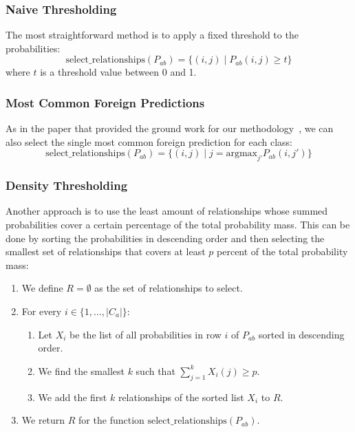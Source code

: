 \subsubsection{Naive Thresholding}

The most straightforward method is to apply a fixed threshold to the probabilities:
\begin{equation*}
      \text{select\_relationships}(P_{ab}) = \{(i, j) \mid P_{ab}(i, j) \geq t\}
\end{equation*}
where $t$ is a threshold value between 0 and 1.

\subsubsection{Most Common Foreign Predictions}

As in the paper that provided the ground work for our methodology~\cite{bevandic_automatic_2022},
we can also select the single most common foreign prediction for each class:
\begin{equation*}
      \text{select\_relationships}(P_{ab}) = \{(i, j) \mid j = \text{argmax}_{j'} P_{ab}(i, j')\}
\end{equation*}

\subsubsection{Density Thresholding}

Another approach is to use the least amount of relationships
whose summed probabilities cover a certain percentage of the total probability mass.
This can be done by sorting the probabilities in descending order and then selecting the smallest set of relationships
that covers at least $p$ percent of the total probability mass:
\begin{enumerate}
      \item We define $R=\emptyset$ as the set of relationships to select.
      \item For every $i\in \{1, \ldots, |C_a|\}$:
            \begin{enumerate}
                  \item Let $X_i$ be the list of all probabilities in row $i$ of $P_{ab}$ sorted in descending order.
                  \item We find the smallest $k$ such that $\sum_{j=1}^k X_i(j) \geq p$.
                  \item We add the first $k$ relationships of the sorted list $X_i$ to $R$.
            \end{enumerate}
      \item We return $R$ for the function $\text{select\_relationships}(P_{ab})$.
\end{enumerate}

